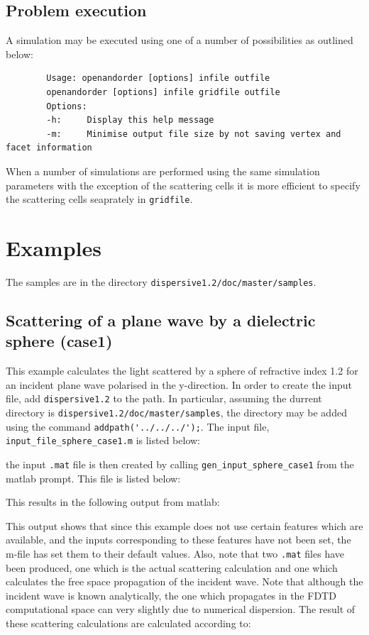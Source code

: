 \documentclass[a4paper, 12pt]{article}
\begin{document}
	\subsection{Problem execution}
	A simulation may be executed using one of a number of possibilities as
	outlined below:
	\begin{verbatim}
		Usage: openandorder [options] infile outfile
		openandorder [options] infile gridfile outfile
		Options:
		-h:     Display this help message
		-m:     Minimise output file size by not saving vertex and facet information
	\end{verbatim}
	When a number of simulations are performed using the same simulation
	parameters with the exception of the scattering cells it is more
	efficient to specify the scattering cells seaprately in \verb+gridfile+.
	\section{Examples}
	The samples are in the directory
	\verb+dispersive1.2/doc/master/samples+.
	\subsection{Scattering of a plane wave by a dielectric sphere (case1)}
	This example calculates the light scattered by a sphere of refractive
	index 1.2 for an incident plane wave polarised in the y-direction. In order to create the input file, add \verb+dispersive1.2+ to the
	path. In particular, assuming the durrent directory is
	\verb+dispersive1.2/doc/master/samples+, the directory may be added
	using the command \verb+addpath('../../../');+. The input file,
	\verb+input_file_sphere_case1.m+ is listed below:
	\small
	
	\normalsize
	the input \verb+.mat+ file is then created by calling
	\verb+gen_input_sphere_case1+ from the matlab prompt. This file is
	listed below:
	\tiny
	
	\normalsize
	This results in the following output from matlab:
	\small
	
	\normalsize
	This output shows that since this example does not use certain
	features which are available, and the inputs corresponding to these
	features have not been set, the m-file has set them to their default
	values. Also, note that two \verb+.mat+ files have been produced, one
	which is the actual scattering calculation and one which calculates
	the free space propagation of the incident wave. Note that although
	the incident wave is known analytically, the one which propagates in
	the FDTD computational space can very slightly due to numerical
	dispersion. The result of these scattering calculations are calculated
	according to:
\end{document}
